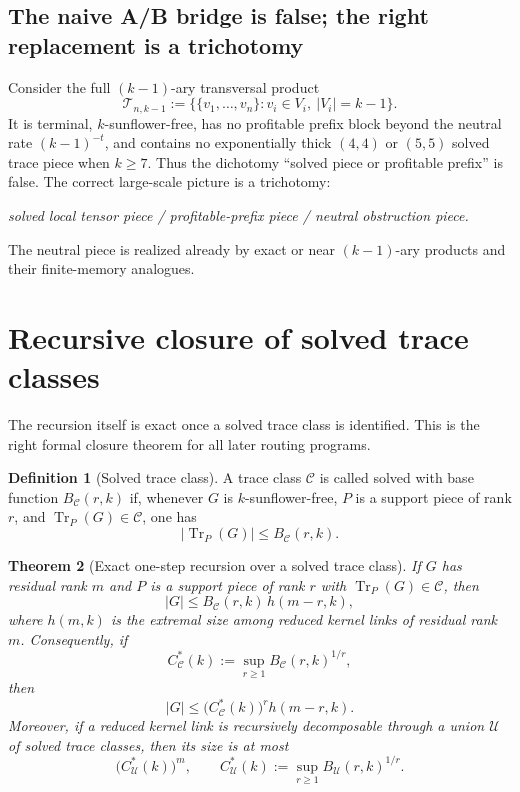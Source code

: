\documentclass[11pt]{article}
\newtheorem{theorem}{Theorem}[section]
\theoremstyle{definition}
\newtheorem{definition}[theorem]{Definition}
\newcommand{\Tr}{\operatorname{Tr}}
\newcommand{\1}{\mathbf{1}}
\begin{document}
\subsection{The naive A/B bridge is false; the right replacement is a trichotomy}
Consider the full $(k-1)$-ary transversal product
\[
\mathcal T_{n,k-1}:=\{\{v_1,\dots,v_n\}: v_i\in V_i,\ |V_i|=k-1\}.
\]
It is terminal, $k$-sunflower-free, has no profitable prefix block beyond the neutral rate $(k-1)^{-t}$, and contains no exponentially thick $(4,4)$ or $(5,5)$ solved trace piece when $k\ge 7$. Thus the dichotomy ``solved piece or profitable prefix'' is false. The correct large-scale picture is a trichotomy:
\begin{center}
\emph{solved local tensor piece / profitable-prefix piece / neutral obstruction piece.}
\end{center}
The neutral piece is realized already by exact or near $(k-1)$-ary products and their finite-memory analogues.

\section{Recursive closure of solved trace classes}\label{sec:union-classes}
The recursion itself is exact once a solved trace class is identified. This is the right formal closure theorem for all later routing programs.

\begin{definition}[Solved trace class]
A trace class $\mathcal C$ is called solved with base function $B_{\mathcal C}(r,k)$ if, whenever $G$ is $k$-sunflower-free, $P$ is a support piece of rank $r$, and $\Tr_P(G)\in \mathcal C$, one has
\[
|\Tr_P(G)|\le B_{\mathcal C}(r,k).
\]
\end{definition}

\begin{theorem}[Exact one-step recursion over a solved trace class]\label{thm:unionclass-closure}
If $G$ has residual rank $m$ and $P$ is a support piece of rank $r$ with $\Tr_P(G)\in \mathcal C$, then
\[
|G|\le B_{\mathcal C}(r,k)\,h(m-r,k),
\]
where $h(m,k)$ is the extremal size among reduced kernel links of residual rank $m$.
Consequently, if
\[
C_{\mathcal C}^*(k):=\sup_{r\ge 1} B_{\mathcal C}(r,k)^{1/r},
\]
then
\[
|G|\le \bigl(C_{\mathcal C}^*(k)\bigr)^r h(m-r,k).
\]
Moreover, if a reduced kernel link is recursively decomposable through a union $\mathcal U$ of solved trace classes, then its size is at most
\[
\bigl(C_{\mathcal U}^*(k)\bigr)^m,
\qquad
C_{\mathcal U}^*(k):=\sup_{r\ge 1} B_{\mathcal U}(r,k)^{1/r}.
\]
\end{theorem}
\end{document}
